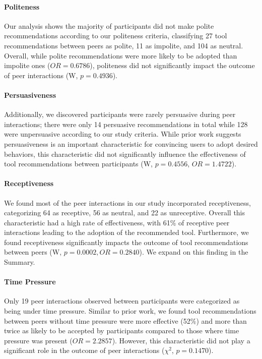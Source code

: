

\paragraph*{Politeness}

Our analysis shows the majority of participants did not make polite recommendations according to our politeness criteria, classifying 27 tool recommendations between peers as polite, 11 as impolite, and 104 as neutral. Overall, while polite recommendations were more likely to be adopted than impolite ones ($OR = 0.6786$), politeness did not significantly impact the outcome of peer interactions (W, $p = 0.4936$).

\paragraph*{Persuasiveness}

Additionally, we discovered participants were rarely persuasive during peer interactions; there were only 14 persuasive recommendations in total while 128 were unpersuasive  according to our study criteria. While prior work suggests persuasiveness is an important characteristic for convincing users to adopt desired behaviors, this characteristic did not significantly influence the effectiveness of tool recommendations between participants (W, $p = 0.4556$, $OR = 1.4722$).

\paragraph*{Receptiveness}

We found most of the peer interactions in our study incorporated receptiveness, categorizing 64 as receptive, 56 as neutral, and 22 as unreceptive. Overall this characteristic had a high rate of effectiveness, with 61\% of receptive peer interactions leading to the adoption of the recommended tool. Furthermore, we found receptiveness significantly impacts the outcome of tool recommendations between peers (W, $p = 0.0002, OR = 0.2840$). We expand on this finding in the Summary.

\paragraph*{Time Pressure}

Only 19 peer interactions observed between participants were categorized as being under time pressure. Similar to prior work, we found tool recommendations between peers without time pressure were more effective (52\%) and more than twice as likely to be accepted by participants compared to those where time pressure was present ($OR = 2.2857$). However, this characteristic did not play a significant role in the outcome of peer interactions ($\chi^2$, $p = 0.1470$).

